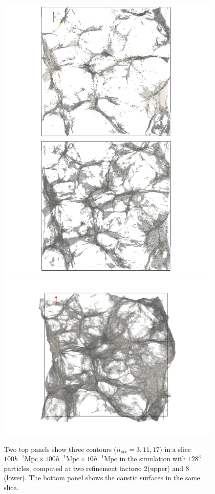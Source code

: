  
\begin{figure}
\begin{minipage}[t]{.99\linewidth}
  \centering\includegraphics[width=10.cm]{Chapter4/Source_v2/fig12a.pdf}
  \centering\includegraphics[width=10.cm]{Chapter4/Source_v2/fig12b.pdf}  
\end{minipage}\hfill
\caption{Two top panels show  three contours ($n_{str}=3, 11, 17$) in a slice $100h^{-1} \text{Mpc} \times 100h^{-1} \text{Mpc} \times 10h^{-1} \text{Mpc}$ in the simulation with $128^3$ particles, computed at two refinement factors: 2(upper) and 8 (lower). The bottom panel shows the caustic surfaces in the same slice. }
\label{fig:NstrCaust}
\end{figure}

